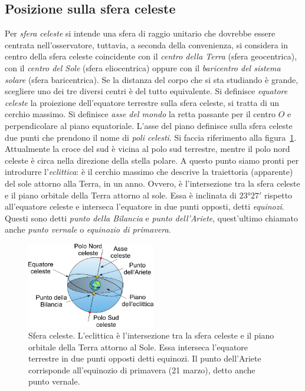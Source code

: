 \subsection{Posizione sulla sfera celeste}\label{sec:posizione-sfera-celeste}
Per \emph{sfera celeste} si intende una sfera di raggio unitario che dovrebbe essere centrata nell'osservatore, tuttavia, a seconda della convenienza, si considera in centro della sfera celeste coincidente con il \emph{centro della Terra} (sfera geocentrica), con il \emph{centro del Sole} (sfera eliocentrica) oppure con il \emph{baricentro del sistema solare} (sfera baricentrica). Se la distanza del corpo che si sta studiando è grande, scegliere uno dei tre diversi centri è del tutto equivalente. Si definisce \emph{equatore celeste} la proiezione dell'equatore terrestre sulla sfera celeste, si tratta di un cerchio massimo. Si definisce \emph{asse del mondo} la retta passante per il centro $O$ e perpendicolare al piano equatoriale. L'asse del piano definisce sulla sfera celeste due punti che prendono il nome di \emph{poli celesti}. Si faccia riferimento alla figura~\ref{fig:sfera-celeste}. Attualmente la croce del sud è vicina al polo sud terrestre, mentre il polo nord celeste è circa nella direzione della stella polare. A questo punto siamo pronti per introdurre l'\emph{eclittica}: è il cerchio massimo che descrive la traiettoria (apparente) del sole attorno alla Terra, in un anno. Ovvero, è l'intersezione tra la sfera celeste e il piano orbitale della Terra attorno al sole. Essa è inclinata di $\ang{23;27;}$ rispetto all'equatore celeste e interseca l'equatore in due punti opposti, detti \emph{equinozi}. Questi sono detti \emph{punto della Bilancia} e \emph{punto dell'Ariete}, quest'ultimo chiamato anche \emph{punto vernale} o \emph{equinozio di primavera}.

\begin{figure}
\centering
\includegraphics[width=0.5\textwidth]{immagini/sfera-celeste.png}
\caption{Sfera celeste. L'eclittica è l'intersezione tra la sfera celeste e il piano orbitale della Terra attorno al Sole. Essa interseca l'equatore terrestre in due punti opposti detti equinozi. Il punto dell'Ariete corrisponde all'equinozio di primavera (21 marzo), detto anche punto vernale.}
\label{fig:sfera-celeste}
\end{figure}

